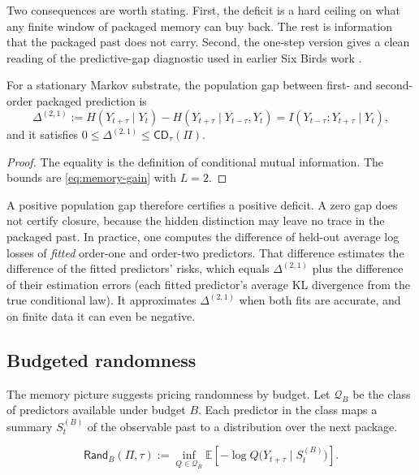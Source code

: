 Two consequences are worth stating. First, the deficit is a hard ceiling on what any finite window of packaged memory can buy back. The rest is information that the packaged past does not carry. Second, the one-step version gives a clean reading of the predictive-gap diagnostic used in earlier Six Birds work \citep{tsiokos2026notch}.

\begin{corollary}\label{cor:pred-gap}
For a stationary Markov substrate, the population gap between first- and second-order packaged prediction is
\[
\Delta^{(2,1)}
:=
H(Y_{t+\tau}\mid Y_t)-H(Y_{t+\tau}\mid Y_{t-\tau},Y_t)
=
I(Y_{t-\tau};Y_{t+\tau}\mid Y_t),
\]
and it satisfies $0\le\Delta^{(2,1)}\le\mathsf{CD}_\tau(\Pi)$.
\end{corollary}

\begin{proof}
The equality is the definition of conditional mutual information. The bounds are \eqref{eq:memory-gain} with $L=2$.
\end{proof}

A positive population gap therefore certifies a positive deficit. A zero gap does not certify closure, because the hidden distinction may leave no trace in the packaged past. In practice, one computes the difference of held-out average log losses of \emph{fitted} order-one and order-two predictors. That difference estimates the difference of the fitted predictors' risks, which equals $\Delta^{(2,1)}$ plus the difference of their estimation errors (each fitted predictor's average KL divergence from the true conditional law). It approximates $\Delta^{(2,1)}$ when both fits are accurate, and on finite data it can even be negative.

\subsection{Budgeted randomness}

The memory picture suggests pricing randomness by budget. Let $\mathcal{Q}_B$ be the class of predictors available under budget $B$. Each predictor in the class maps a summary $S^{(B)}_t$ of the observable past to a distribution over the next package.

\begin{definition}\label{def:budgeted-rand}
\begin{equation}
\mathsf{Rand}_B(\Pi,\tau)
:=
\inf_{Q \in \mathcal{Q}_B}
\mathbb{E}\!\left[
-\log Q\bigl(Y_{t+\tau}\mid S_t^{(B)}\bigr)
\right].
\label{eq:budgeted-rand}
\end{equation}
\end{definition}

